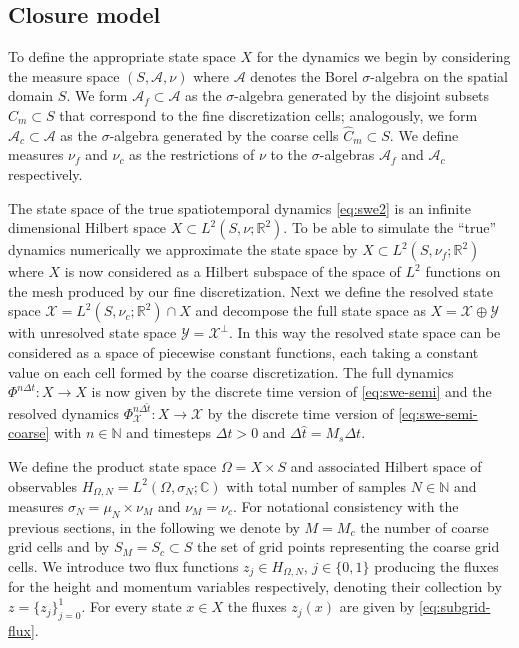 \documentclass[letterpaper,10pt,3p,preprint]{elsarticle}
\newcommand{\Nbb}{\mathbb{N}}
\newcommand{\Rbb}{\mathbb{R}}
\newcommand{\Cbb}{\mathbb{C}}
\newcommand{\Xcal}{\mathcal{X}}
\newcommand{\Ycal}{\mathcal{Y}}
\begin{document}
\subsection{Closure model}\label{sec:swe-closure}
To define the appropriate state space $X$ for the dynamics
we begin by considering the measure space
$(S,\mathcal{A},\nu)$ where $\mathcal{A}$ denotes
the Borel $\sigma$-algebra on the spatial domain $S$.
We form $\mathcal{A}_f\subset\mathcal{A}$
as the $\sigma$-algebra generated by the disjoint subsets
$C_m\subset S$ that correspond to the fine
discretization cells;
analogously, we form
$\mathcal{A}_c\subset\mathcal{A}$
as the $\sigma$-algebra generated by the coarse
cells $\hat{C}_m\subset S$.
We define measures $\nu_f$ and $\nu_c$ as the restrictions
of $\nu$ to the $\sigma$-algebras
$\mathcal{A}_f$ and $\mathcal{A}_c$
respectively.

The state space of the true spatiotemporal dynamics
\eqref{eq:swe2} is an infinite dimensional Hilbert space
$X\subset L^2(S,\nu;\Rbb^2)$.
To be able to simulate the ``true'' dynamics numerically
we approximate the state space by
$X\subset L^2(S,\nu_f;\Rbb^2)$
where $X$ is now considered as a Hilbert subspace of the space of
$L^2$ functions on the mesh produced by our fine discretization.
Next we define the resolved state space
$\Xcal=L^2(S,\nu_c;\Rbb^2)\cap X$
and decompose the full state space as $X=\Xcal\oplus\Ycal$
with unresolved state space $\Ycal=\Xcal^{\perp}$.
In this way the resolved state space can be considered as a
space of piecewise constant functions, each taking a constant
value on each cell formed by the coarse discretization.
The full dynamics
$\Phi^{n\Delta t}\colon X\to X$
is now given by the discrete time version of
\eqref{eq:swe-semi}
and the resolved dynamics
$\Phi_\Xcal^{n\Delta\hat{t}}\colon X\to\Xcal$
by the discrete time version of
\eqref{eq:swe-semi-coarse}
with $n\in\Nbb$ and timesteps $\Delta t>0$
and $\Delta\hat{t}=M_s\Delta t$.

We define the product state space $\Omega=X\times S$
and associated Hilbert space of observables
$H_{\Omega,N}=L^2(\Omega,\sigma_N;\Cbb)$
with total number of samples $N\in\Nbb$
and measures $\sigma_{N}=\mu_N\times\nu_M$
and $\nu_M=\nu_c$.
For notational consistency with the previous sections,
in the following we denote by $M=M_c$ the number of coarse grid cells
and by $S_M=S_c\subset S$ the set of grid points representing the coarse
grid cells.
We introduce two flux functions
$z_j\in H_{\Omega,N}$, $j\in\{0,1\}$
producing the fluxes for the height and momentum
variables respectively,
denoting their collection by $z=\{z_j\}_{j=0}^1$.
For every state $x\in X$ the fluxes $z_j(x)$ are given
by \eqref{eq:subgrid-flux}.
\end{document}
